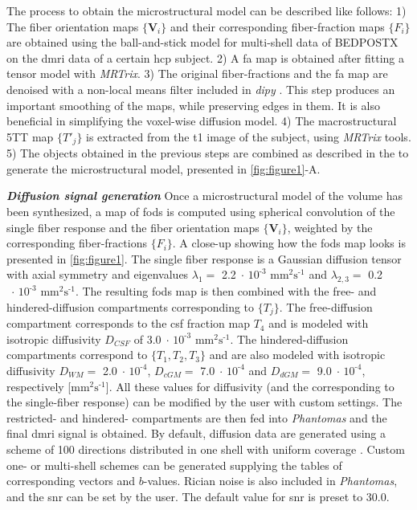 \documentclass[english]{frontiers/frontiersSCNS} %
\newcommand{\e}[1]{\ensuremath{\;\cdot\,\text{10}^\text{#1}}}
\newcommand{\diffunits}{\ensuremath{\text{mm}^2\text{s}^{\text{-1}}}}
\begin{document}
The process to obtain the microstructural model can be described like follows:
1) The fiber orientation maps $\{\mathbf{V}_i\}$ and their corresponding fiber-fraction maps $\{F_i\}$ are
  obtained using the ball-and-stick model for multi-shell data of BEDPOSTX \citep{jbabdi_modelbased_2012}
  on the \gls*{dmri} data of a certain \gls*{hcp} subject.
2) A \gls*{fa} map is obtained after fitting a tensor model with \emph{MRTrix}.
3) The original fiber-fractions and the \gls*{fa} map are denoised with a non-local means filter included
  in \emph{dipy} \citep{garyfallis_dipy_2011}.
This step produces an important smoothing of the maps, while preserving edges in them.
It is also beneficial in simplifying the voxel-wise diffusion model.
4) The macrostructural 5TT map $\{T'_j\}$ is extracted from the \acrlong*{t1} image of the subject, using \emph{MRTrix} tools.
5) The objects obtained in the previous steps are combined as described in the  to generate the
  microstructural model, presented in \autoref{fig:figure1}-A.

\noindent\textbf{\textit{Diffusion signal generation\textcolon}\label{sec:data_dwi}} %
Once a microstructural model of the volume has been synthesized, a map of \glspl{fod} is computed using spherical
  convolution of the single fiber response and the fiber orientation maps $\{\mathbf{V}_i\}$, weighted by the
  corresponding fiber-fractions $\{F_i\}$.
A close-up showing how the \glspl{fod} map looks is presented in \autoref{fig:figure1}.
The single fiber response is a Gaussian diffusion tensor with axial symmetry and eigenvalues $\lambda_1=$ 2.2\e{-3}
  \diffunits{} and $\lambda_{2,3}=$ 0.2\e{-3} \diffunits{}.
The resulting \glspl{fod} map is then combined with the free- and hindered-diffusion compartments corresponding to $\{T_j\}$.
The free-diffusion compartment corresponds to the \gls*{csf} fraction map $T_4$ and is modeled with isotropic
  diffusivity $D_{CSF}$ of 3.0\e{-3} \diffunits{}.
The hindered-diffusion compartments correspond to $\{T_1,T_2,T_3\}$ and are also modeled with isotropic diffusivity
  $D_{WM} =$ 2.0\e{-4}, $D_{cGM} =$ 7.0\e{-4} and $D_{dGM} =$ 9.0\e{-4}, respectively [\diffunits{}].
All these values for diffusivity (and the corresponding to the single-fiber response) can be modified by the user with
  custom settings.
The restricted- and hindered- compartments are then fed into \emph{Phantomas} \citep{caruyer_phantomas_2014}
  and the final \gls*{dmri} signal is obtained.
By default, diffusion data are generated using a scheme of 100 directions distributed in one shell with uniform
  coverage \citep{caruyer_design_2013}.
Custom one- or multi-shell schemes can be generated supplying the tables of corresponding vectors and $b$-values.
Rician noise is also included in \emph{Phantomas}, and the \gls*{snr} can be set by the user.
The default value for \gls*{snr} is preset to 30.0.
\end{document}
